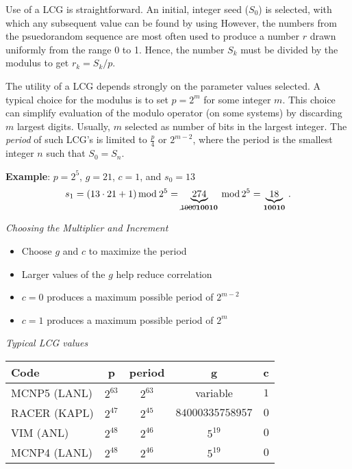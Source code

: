 Use of a LCG is straightforward.  An initial, integer seed ($S_0$)
is selected, with which any subsequent value 
can be found by using   
However, the numbers from the psuedorandom sequence are most often used to 
produce a number $r$ drawn uniformly from the range 0 to 1.  Hence,
the number $S_k$ must be divided by the modulus to 
get $r_k = S_k / p$.


The utility of a LCG depends strongly on the parameter values 
selected.  A typical choice for the modulus is to 
set $p = 2^m$ for some integer $m$.  This choice can simplify 
evaluation of the modulo operator (on some systems) 
by discarding $m$ largest digits.  Usually,
$m$ selected as number of bits in the largest integer.
The \emph{period} of such LCG's is limited to $\frac{p}{4}$ or $2^{m-2}$,
where the period is the smallest integer $n$ such that $S_0 = S_n$.


\textbf{Example}: $p=2^5$, $g=21$, $c=1$, and $s_0 = 13$
\begin{equation*}
        s_1 = (13 \cdot 21 +1) \, \textrm{mod} \: 2^5 
            =  \underbrace{274}_{\cancel{1000}\textbf{10010}} \: \textrm{mod} \, 2^5 = \underbrace{18}_{\textbf{10010}} \, .
\end{equation*}


\emph{Choosing the Multiplier and Increment}
  \begin{itemize}
     \item Choose $g$ and $c$ to maximize the period
     \item Larger values of the $g$ help reduce correlation
     \item $c=0$ produces a maximum possible period of $2^{m-2}$
     \item $c=1$ produces a maximum possible period of $2^m$
  \end{itemize}


\emph{Typical LCG values}
  \begin{center}
  \begin{tabular}{ | l | c | c | c | c | }
\hline
  Code & p & period & g & c \\
\hline
  MCNP5 (LANL) & $2^{63}$ & $2^{63}$ & variable & $1$ \\
  RACER (KAPL) & $2^{47}$ & $2^{45}$ & $84000335758957$ & $0$ \\
  VIM (ANL) & $2^{48}$ & $2^{46}$ & $5^{19}$ & $0$ \\
  MCNP4 (LANL) & $2^{48}$ & $2^{46}$ & $5^{19}$ & $0$ \\
\hline   
  \end{tabular}
  \end{center}


